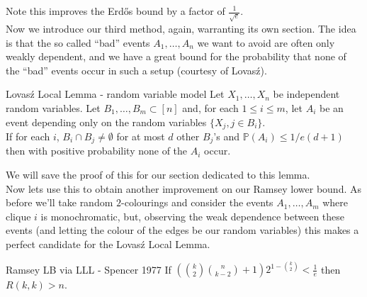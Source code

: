 \documentclass{article}
\begin{document}
Note this improves the Erd\H{o}s bound by a factor of $\frac{1}{\sqrt{e}}$. \\

Now we introduce our third method, again, warranting its own section. The idea is that the so called ``bad'' events
$A_1, \dots, A_n$ we want to avoid are often only weakly dependent, and we have a great bound for the probability 
that none of the ``bad'' events occur in such a setup (courtesy of Lovas\'{z}).

\begin{lemma}[]{Lovas\'{z} Local Lemma - random variable model}
    Let $X_1, \dots, X_n$ be independent random variables. Let $B_1, \dots, B_m \subset [n]$ and, for each
    $1 \leq i \leq m$, let $A_i$ be an event depending only on the random variables $\{X_j, j \in B_i\}$. \\ 
    
    If for each $i$, $B_i \cap B_j \neq \emptyset$ for at most $d$ other $B_j$'s and $\mathbb{P}(A_i) \leq 1/e(d+1)$ 
    then with positive probability none of the $A_i$ occur. 
\end{lemma}

We will save the proof of this for our section dedicated to this lemma. \\

Now lets use this to obtain another improvement on our Ramsey lower bound. As before we'll take random $2$-colourings 
and consider the events $A_1, \dots, A_m$ where clique $i$ is monochromatic, but, observing the weak dependence 
between these events (and letting the colour of the edges be our random variables) this makes a perfect candidate 
for the Lovas\'{z} Local Lemma. 

\begin{proposition}[]{Ramsey LB via LLL - Spencer 1977}
    If $\left(\binom{k}{2}\binom{n}{k-2} + 1\right)2^{1 - \binom{k}{2}} < \frac{1}{e}$ then $R(k, k) > n$. 
\end{proposition}
\end{document}
